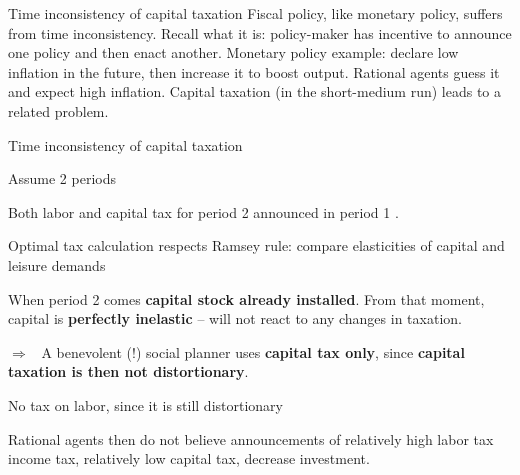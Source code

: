 \documentclass{beamer}
\newenvironment{mytemize}
{\vfill\itemize[nolistsep,itemsep=\fill,label=\color{blue}{$\triangleright$}]}
  {\enditemize}
\newcommand{\rarr}{$\Rightarrow$\ }
\begin{document}
\begin{frame}{Time inconsistency of capital taxation}
  Fiscal policy, like monetary policy, suffers from time inconsistency. \vfill
  Recall what it is: policy-maker has incentive to announce one policy and then enact another. Monetary policy example: declare low inflation in the future, then increase it to boost output. Rational agents guess it and expect high inflation. 
  \vfill
  Capital taxation (in the short-medium run) leads to a related problem.
\end{frame}
\begin{frame}{Time inconsistency of capital taxation}
  \begin{mytemize}
  \item Assume 2 periods
  \item Both labor and capital tax for period 2 announced in period 1 .
  \item Optimal tax calculation respects Ramsey rule: compare elasticities of capital and leisure demands
  \item When period 2 comes \textbf{capital stock already installed}. From that moment, capital is \textbf{perfectly inelastic} -- will not react to any changes in taxation. 
  \item[\rarr] A benevolent (!) social planner uses \textbf{capital tax only}, since \textbf{capital taxation is then not distortionary}. 
  \item No tax on labor, since it is still distortionary
  \item Rational agents then do not believe announcements of relatively high labor tax income tax, relatively low capital tax, decrease investment. 
  \end{mytemize}
\end{frame}
\end{document}
